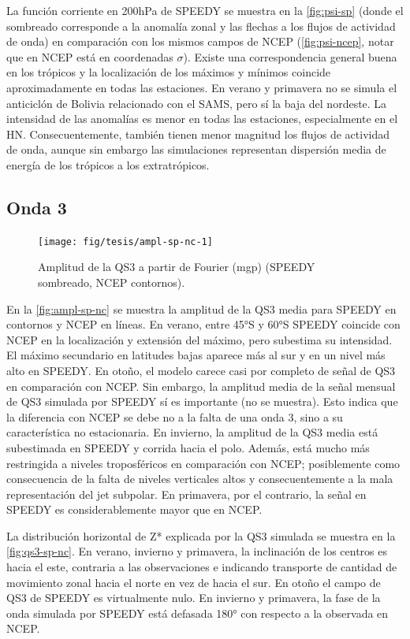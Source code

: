 \documentclass[spanish,a4paper,12pt,oneside]{book}
\begin{document}
La función corriente en 200hPa de SPEEDY se muestra en la
\autoref{fig:psi-sp} (donde el sombreado corresponde a la anomalía zonal
y las flechas a los flujos de actividad de onda) en comparación con los
mismos campos de NCEP (\autoref{fig:psi-ncep}, notar que en NCEP está en
coordenadas \(\sigma\)). Existe una correspondencia general buena en los
trópicos y la localización de los máximos y mínimos coincide
aproximadamente en todas las estaciones. En verano y primavera no se
simula el anticiclón de Bolivia relacionado con el SAMS, pero sí la baja
del nordeste. La intensidad de las anomalías es menor en todas las
estaciones, especialmente en el HN. Consecuentemente, también tienen
menor magnitud los flujos de actividad de onda, aunque sin embargo las
simulaciones representan dispersión media de energía de los trópicos a
los extratrópicos.

\subsection{Onda 3}\label{onda-3-1}

\begin{figure}
\texttt{[image: fig/tesis/ampl-sp-nc-1]} \caption{Amplitud de la QS3 a partir de Fourier (mgp) (SPEEDY sombreado, NCEP contornos).}\label{fig:ampl-sp-nc}
\end{figure}

En la \autoref{fig:ampl-sp-nc} se muestra la amplitud de la QS3 media
para SPEEDY en contornos y NCEP en líneas. En verano, entre 45°S y 60°S
SPEEDY coincide con NCEP en la localización y extensión del máximo, pero
subestima su intensidad. El máximo secundario en latitudes bajas aparece
más al sur y en un nivel más alto en SPEEDY. En otoño, el modelo carece
casi por completo de señal de QS3 en comparación con NCEP. Sin embargo,
la amplitud media de la señal mensual de QS3 simulada por SPEEDY sí es
importante (no se muestra). Esto indica que la diferencia con NCEP se
debe no a la falta de una onda 3, sino a su característica no
estacionaria. En invierno, la amplitud de la QS3 media está subestimada
en SPEEDY y corrida hacia el polo. Además, está mucho más restringida a
niveles troposféricos en comparación con NCEP; posiblemente como
consecuencia de la falta de niveles verticales altos y consecuentemente
a la mala representación del jet subpolar. En primavera, por el
contrario, la señal en SPEEDY es considerablemente mayor que en NCEP.

La distribución horizontal de Z* explicada por la QS3 simulada se
muestra en la \autoref{fig:qs3-sp-nc}. En verano, invierno y primavera,
la inclinación de los centros es hacia el este, contraria a las
observaciones e indicando transporte de cantidad de movimiento zonal
hacia el norte en vez de hacia el sur. En otoño el campo de QS3 de
SPEEDY es virtualmente nulo. En invierno y primavera, la fase de la onda
simulada por SPEEDY está defasada 180° con respecto a la observada en
NCEP.
\end{document}
